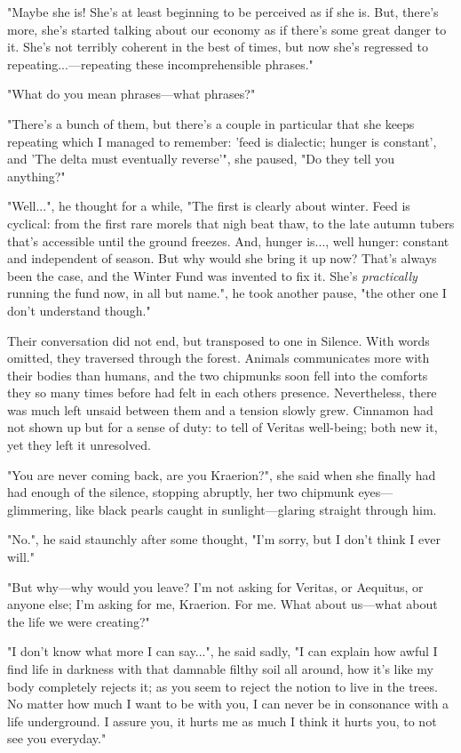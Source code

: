"Maybe she is! She's at least beginning to be perceived as if she is. But, there's more, she's started talking about our economy as if there's some great danger to it. She's not terribly coherent in the best of times, but now she's regressed to repeating...---repeating these incomprehensible phrases."

"What do you mean phrases---what phrases?"

"There's a bunch of them, but there's a couple in particular that she keeps repeating which I managed to remember: 'feed is dialectic; hunger is constant', and 'The delta must eventually reverse'", she paused, "Do they tell you anything?"

"Well...", he thought for a while, "The first is clearly about winter. Feed is cyclical: from the first rare morels that nigh beat thaw, to the late autumn tubers that's accessible until the ground freezes. And, hunger is..., well hunger: constant and independent of season. But why would she bring it up now? That's always been the case, and the Winter Fund was invented to fix it. She's \textit{practically} running the fund now, in all but name.", he took another pause, "the other one I don't understand though."

Their conversation did not end, but transposed to one in Silence. With words omitted, they traversed through the forest. Animals communicates more with their bodies than humans, and the two chipmunks soon fell into the comforts they so many times before had felt in each others presence. Nevertheless, there was much left unsaid between them and a tension slowly grew. Cinnamon had not shown up but for a sense of duty: to tell of Veritas well-being; both new it, yet they left it unresolved.

"You are never coming back, are you Kraerion?", she said when she finally had had enough of the silence, stopping abruptly, her two chipmunk eyes---glimmering, like black pearls caught in sunlight---glaring straight through him.

"No.", he said staunchly after some thought, "I'm sorry, but I don't think I ever will."

"But why---why would you leave? I'm not asking for Veritas, or Aequitus, or anyone else; I'm asking for me, Kraerion. For me. What about us---what about the life we were creating?"

"I don't know what more I can say...", he said sadly, "I can explain how awful I find life in darkness with that damnable filthy soil all around, how it's like my body completely rejects it; as you seem to reject the notion to live in the trees. No matter how much I want to be with you, I can never be in consonance with a life underground. I assure you, it hurts me as much I think it hurts you, to not see you everyday."


